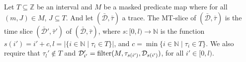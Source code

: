 
\begin{definition}
    \label{def:mt-slice}
    Let $T \subseteq \mathbb{Z}$ be an interval and $M$ be a masked predicate map where for all $(m, J) \in M$, $J \subseteq T$.
    And let $(\bar{\mathcal{D}}, \bar{\tau})$ a trace.
    The MT-slice of $(\bar{\mathcal{D}}, \bar{\tau})$ is the time slice $(\bar{\mathcal{D}}', \bar{\tau}')$ of $(\bar{\mathcal{D}}, \bar{\tau})$, where $s:[0,l) \to \mathbb{N}$ is the function $s(i') = i' + c, l = |\{i \in \mathbb{N} \mid \tau_i \in T\}|$, and $c = \min\{i \in \mathbb{N} \mid \tau_i \in T \}$. 
    We also require that $\tau_l' \not\in T$ and $\mathcal{D}'_{i'} = \operatorname{filter}(M, \tau_{s(i')}, \mathcal{D}_{s(i')})$, for all $i' \in [0,l)$.
\end{definition}


